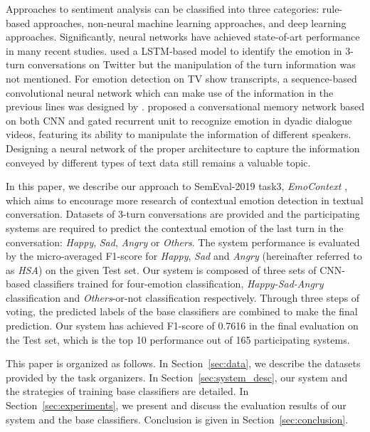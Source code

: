 \documentclass[11pt,a4paper]{article}
\begin{document}
Approaches to sentiment analysis can be classified into three categories: rule-based approaches, non-neural machine learning approaches, and deep learning approaches. Significantly, neural networks have achieved state-of-art performance in many recent studies. \citet{Gupta2017A} used a LSTM-based model to identify the emotion in 3-turn conversations on Twitter but the manipulation of the turn information was not mentioned. For emotion detection on TV show transcripts, a sequence-based convolutional neural network which can make use of the information in the previous lines was designed by \citet{Zahiri2017Emotion}. \citet{Hazarika2018} proposed a conversational memory network based on both CNN \cite{Lecun1998Convolutional} and gated recurrent unit \cite{DChungGCB14} to recognize emotion in dyadic dialogue videos, featuring its ability to manipulate the information of different speakers. Designing a neural network of the proper architecture to capture the information conveyed by different types of text data still remains a valuable topic.

In this paper, we describe our approach to SemEval-2019 task3, {\em EmoContext} \cite{SemEval2019Task3}, which aims to encourage more research of contextual emotion detection in textual conversation. Datasets of 3-turn conversations are provided and the participating systems are required to predict the contextual emotion of the last turn in the conversation: {\em Happy}, {\em Sad}, {\em Angry} or {\em Others}. The system performance is evaluated by the micro-averaged F1-score for {\em Happy}, {\em Sad} and {\em Angry} (hereinafter referred to as {\em HSA}) on the given Test set. Our system is composed of three sets of CNN-based classifiers trained for four-emotion classification, {\em Happy-Sad-Angry} classification and {\em Others}-or-not classification respectively. Through three steps of voting, the predicted labels of the base classifiers are combined to make the final prediction. Our system has achieved F1-score of 0.7616 in the final evaluation on the Test set, which is the top 10 performance out of 165 participating systems.

This paper is organized as follows. In Section~\ref{sec:data}, we describe the datasets provided by the task organizers. In Section~\ref{sec:system_desc}, our system and the strategies of training base classifiers are detailed. In Section~\ref{sec:experiments}, we present and discuss the evaluation results of our system and the base classifiers. Conclusion is given in Section~\ref{sec:conclusion}.
\end{document}
